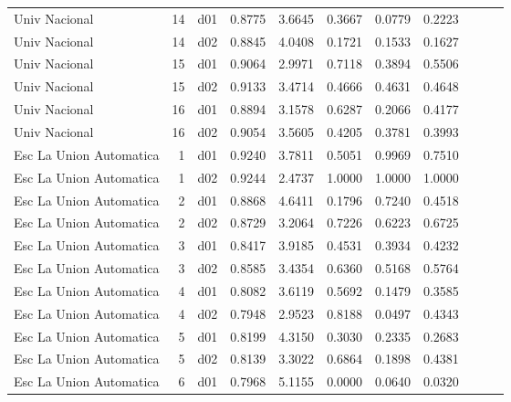 \begin{landscape}
\begin{longtable}{p{2cm}rrrrrrrrrr}
           Univ Nacional  &         14 &     d01 &   0.8775 &  3.6645 &        0.3667 &           0.0779 &  0.2223 \\
           Univ Nacional  &         14 &     d02 &   0.8845 &  4.0408 &        0.1721 &           0.1533 &  0.1627 \\
           Univ Nacional  &         15 &     d01 &   0.9064 &  2.9971 &        0.7118 &           0.3894 &  0.5506 \\
           Univ Nacional  &         15 &     d02 &   0.9133 &  3.4714 &        0.4666 &           0.4631 &  0.4648 \\
           Univ Nacional  &         16 &     d01 &   0.8894 &  3.1578 &        0.6287 &           0.2066 &  0.4177 \\
           Univ Nacional  &         16 &     d02 &   0.9054 &  3.5605 &        0.4205 &           0.3781 &  0.3993 \\
  Esc La Union Automatica &          1 &     d01 &   0.9240 &  3.7811 &        0.5051 &           0.9969 &  0.7510 \\
  Esc La Union Automatica &          1 &     d02 &   0.9244 &  2.4737 &        1.0000 &           1.0000 &  1.0000 \\
  Esc La Union Automatica &          2 &     d01 &   0.8868 &  4.6411 &        0.1796 &           0.7240 &  0.4518 \\
  Esc La Union Automatica &          2 &     d02 &   0.8729 &  3.2064 &        0.7226 &           0.6223 &  0.6725 \\
  Esc La Union Automatica &          3 &     d01 &   0.8417 &  3.9185 &        0.4531 &           0.3934 &  0.4232 \\
  Esc La Union Automatica &          3 &     d02 &   0.8585 &  3.4354 &        0.6360 &           0.5168 &  0.5764 \\
  Esc La Union Automatica &          4 &     d01 &   0.8082 &  3.6119 &        0.5692 &           0.1479 &  0.3585 \\
  Esc La Union Automatica &          4 &     d02 &   0.7948 &  2.9523 &        0.8188 &           0.0497 &  0.4343 \\
  Esc La Union Automatica &          5 &     d01 &   0.8199 &  4.3150 &        0.3030 &           0.2335 &  0.2683 \\
  Esc La Union Automatica &          5 &     d02 &   0.8139 &  3.3022 &        0.6864 &           0.1898 &  0.4381 \\
  Esc La Union Automatica &          6 &     d01 &   0.7968 &  5.1155 &        0.0000 &           0.0640 &  0.0320 \\

\end{longtable}
\end{landscape}
